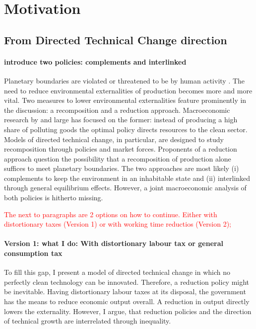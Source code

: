 \documentclass[12pt]{article}
\newcommand{\tr}[1]{\textcolor{red}{#1}}
\begin{document}
\section{Motivation}
\subsection{From Directed Technical Change direction}
\paragraph{introduce two policies: complements and interlinked}
Planetary boundaries are violated or threatened to be by human activity \citep{Rockstrom2009AHumanity}. The need to reduce environmental externalities of production becomes more and more vital.  %
Two measures to lower environmental externalities feature prominently in the discussion: a recomposition and a reduction approach. Macroeconomic research by and large has focused on the former: instead of producing a high share of polluting goods the optimal policy directs resources to the clean sector. Models of directed technical change, in particular, are designed to study recomposition through policies and market forces.
Proponents of a reduction approach question the possibility that a recomposition of production alone suffices to meet planetary boundaries. The two approaches are most likely (i) complements to keep the environment in an inhabitable state and (ii) interlinked through general equilibrium effects. However,
a joint macroeconomic analysis of both policies is hitherto missing. 

\tr{The next to paragraphs are 2 options on how to continue. Either with distortionary taxes (Version 1) or with working time reductios (Version 2); }
\paragraph{Version 1: what I do: With distortionary labour tax or general consumption tax}
To fill this gap, I present a model of directed technical change in which no perfectly clean technology can be innovated. Therefore, a reduction policy might be inevitable. Having distortionary labour taxes at its disposal, the government has the means to reduce economic output overall. A reduction in output directly lowers the externality. However, I argue, that reduction policies and the direction of technical growth are interrelated through inequality. 
\end{document}
